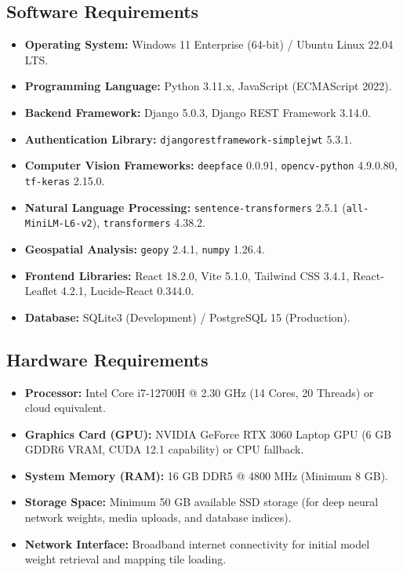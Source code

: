 \documentclass[12pt,a4paper]{report}
\begin{document}
\subsection{Software Requirements}
\begin{itemize}
    \item \textbf{Operating System:} Windows 11 Enterprise (64-bit) / Ubuntu Linux 22.04 LTS.
    \item \textbf{Programming Language:} Python 3.11.x, JavaScript (ECMAScript 2022).
    \item \textbf{Backend Framework:} Django 5.0.3, Django REST Framework 3.14.0.
    \item \textbf{Authentication Library:} \texttt{djangorestframework-simplejwt} 5.3.1.
    \item \textbf{Computer Vision Frameworks:} \texttt{deepface} 0.0.91, \texttt{opencv-python} 4.9.0.80, \texttt{tf-keras} 2.15.0.
    \item \textbf{Natural Language Processing:} \texttt{sentence-transformers} 2.5.1 (\texttt{all-MiniLM-L6-v2}), \texttt{transformers} 4.38.2.
    \item \textbf{Geospatial Analysis:} \texttt{geopy} 2.4.1, \texttt{numpy} 1.26.4.
    \item \textbf{Frontend Libraries:} React 18.2.0, Vite 5.1.0, Tailwind CSS 3.4.1, React-Leaflet 4.2.1, Lucide-React 0.344.0.
    \item \textbf{Database:} SQLite3 (Development) / PostgreSQL 15 (Production).
\end{itemize}

\subsection{Hardware Requirements}
\begin{itemize}
    \item \textbf{Processor:} Intel Core i7-12700H @ 2.30 GHz (14 Cores, 20 Threads) or cloud equivalent.
    \item \textbf{Graphics Card (GPU):} NVIDIA GeForce RTX 3060 Laptop GPU (6 GB GDDR6 VRAM, CUDA 12.1 capability) or CPU fallback.
    \item \textbf{System Memory (RAM):} 16 GB DDR5 @ 4800 MHz (Minimum 8 GB).
    \item \textbf{Storage Space:} Minimum 50 GB available SSD storage (for deep neural network weights, media uploads, and database indices).
    \item \textbf{Network Interface:} Broadband internet connectivity for initial model weight retrieval and mapping tile loading.
\end{itemize}
\end{document}
